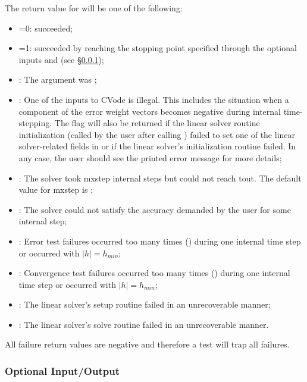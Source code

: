 The return value  for  will be one of the following:
\begin{itemize}
\item {}=0:
   succeeded;
\item {}=1:
   succeeded by reaching the stopping point specified through
  the optional inputs  and  
  (see \S\ref{sss:optional_io});
\item {}:
  The  argument was ;
\item {}:
  One of the inputs to CVode is illegal. This includes the situation when a 
  component of the error weight vectors becomes negative during internal 
  time-stepping. The  flag will also be returned if the linear 
  solver routine initialization (called by the user after calling 
  ) failed to set one of the linear solver-related fields 
  in  or if the linear solver's initialization routine failed. 
  In any case, the user should see the printed error message for more details;
\item {}: 
  The solver took mxstep internal steps but could not reach tout. 
  The default value for mxstep is ;      
\item {}: 
  The solver could not satisfy the accuracy demanded by the user for some 
  internal step;
\item {}: 
  Error test failures occurred too many times () during one 
  internal time step or occurred with $|h| = h_{min}$;
\item {}: 
  Convergence test failures occurred too many times () during 
  one internal time step or occurred with $|h| = h_{min}$;             
\item {}: 
  The linear solver's setup routine failed in an unrecoverable manner;
\item {}: 
  The linear solver's solve routine failed in an unrecoverable manner.
\end{itemize} 
All failure return values are negative and therefore a test 
will trap all  failures.

\subsubsection{Optional Input/Output}\label{sss:optional_io}

